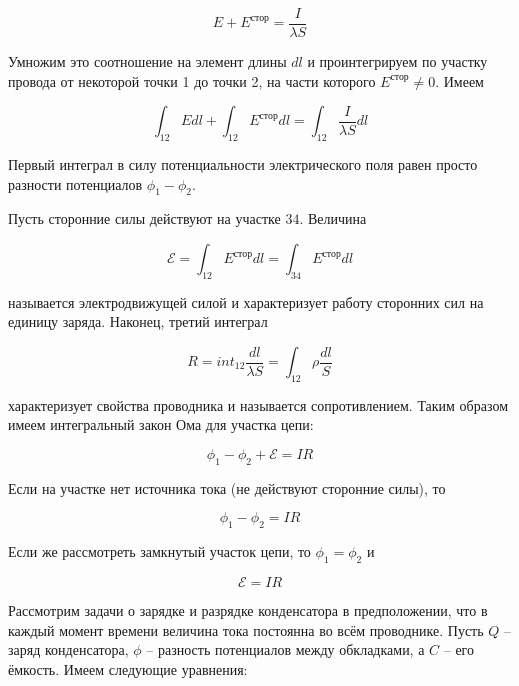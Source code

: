 \begin{equation*}
    E + E^\text{стор} = \frac{I}{\lambda S}
\end{equation*}

Умножим это соотношение на элемент длины $dl$ и проинтегрируем по участку провода от некоторой точки 1 до точки 2, на части которого $E^\text{стор} \neq 0$. Имеем

\begin{equation*}
    \int_{12} E dl + \int_{12} E^\text{стор} dl = \int_{12} \frac{I}{\lambda S} dl
\end{equation*}

\noindent
Первый интеграл в силу потенциальности электрического поля равен просто разности потенциалов $\phi_1 - \phi_2$.

Пусть сторонние силы действуют на участке $34$. Величина

\begin{equation}
    \mathcal{E} = \int_{12} E^\text{стор} dl = \int_{34} E^\text{стор} dl
\end{equation}

\noindent
называется электродвижущей силой и характеризует работу сторонних сил на единицу заряда. Наконец, третий интеграл

\begin{equation}
    R = int_{12} \frac{dl}{\lambda S} = \int_{12} \rho \frac{dl}{S}
\end{equation}

\noindent
характеризует свойства проводника и называется сопротивлением. Таким образом имеем интегральный закон Ома для участка цепи:

\begin{equation}
    \phi_1 - \phi_2 + \mathcal{E} = I R
\end{equation}

\noindent
Если на участке нет источника тока (не действуют сторонние силы), то

\begin{equation}
    \phi_1 - \phi_2 = I R
\end{equation}

\noindent
Если же рассмотреть замкнутый участок цепи, то $\phi_1 = \phi_2$ и

\begin{equation}
    \mathcal{E} = I R
\end{equation}

Рассмотрим задачи о зарядке и разрядке конденсатора в предположении, что в каждый момент времени величина тока постоянна во всём проводнике. Пусть $Q$ -- заряд конденсатора, $\phi$ -- разность потенциалов между обкладками, а $C$ -- его ёмкость. Имеем следующие уравнения:

